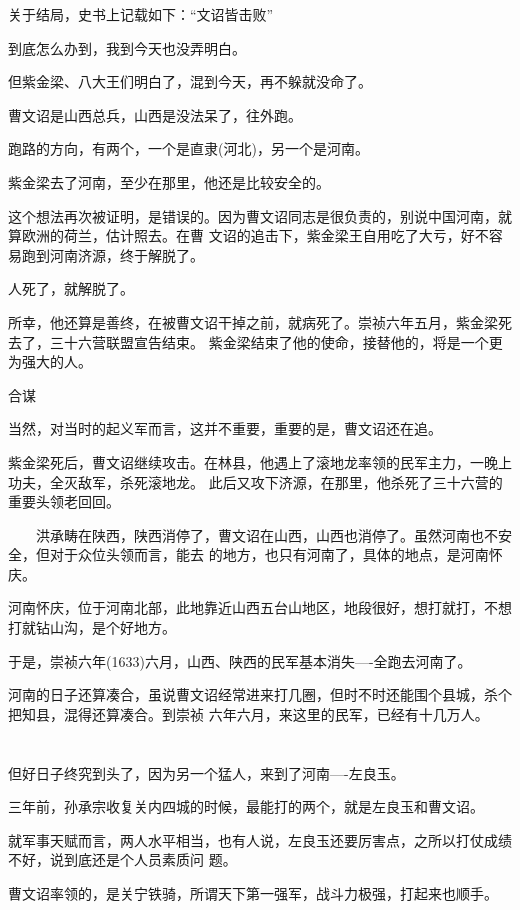 \documentclass[11pt,a4paper,onecolumn]{article}
\begin{document}
关于结局，史书上记载如下：``文诏皆击败''

到底怎么办到，我到今天也没弄明白。

但紫金梁、八大王们明白了，混到今天，再不躲就没命了。

曹文诏是山西总兵，山西是没法呆了，往外跑。

跑路的方向，有两个，一个是直隶(河北)，另一个是河南。

紫金梁去了河南，至少在那里，他还是比较安全的。

这个想法再次被证明，是错误的。因为曹文诏同志是很负责的，别说中国河南，就算欧洲的荷兰，估计照去。在曹
文诏的追击下，紫金梁王自用吃了大亏，好不容易跑到河南济源，终于解脱了。

人死了，就解脱了。

所幸，他还算是善终，在被曹文诏干掉之前，就病死了。崇祯六年五月，紫金梁死去了，三十六营联盟宣告结束。
紫金梁结束了他的使命，接替他的，将是一个更为强大的人。

合谋

当然，对当时的起义军而言，这并不重要，重要的是，曹文诏还在追。

紫金梁死后，曹文诏继续攻击。在林县，他遇上了滚地龙率领的民军主力，一晚上功夫，全灭敌军，杀死滚地龙。
此后又攻下济源，在那里，他杀死了三十六营的重要头领老回回。

　　洪承畴在陕西，陕西消停了，曹文诏在山西，山西也消停了。虽然河南也不安全，但对于众位头领而言，能去
的地方，也只有河南了，具体的地点，是河南怀庆。

河南怀庆，位于河南北部，此地靠近山西五台山地区，地段很好，想打就打，不想打就钻山沟，是个好地方。

于是，崇祯六年(1633)六月，山西、陕西的民军基本消失----全跑去河南了。

河南的日子还算凑合，虽说曹文诏经常进来打几圈，但时不时还能围个县城，杀个把知县，混得还算凑合。到崇祯
六年六月，来这里的民军，已经有十几万人。

\section[\thesection]{}

但好日子终究到头了，因为另一个猛人，来到了河南----左良玉。

三年前，孙承宗收复关内四城的时候，最能打的两个，就是左良玉和曹文诏。

就军事天赋而言，两人水平相当，也有人说，左良玉还要厉害点，之所以打仗成绩不好，说到底还是个人员素质问
题。

曹文诏率领的，是关宁铁骑，所谓天下第一强军，战斗力极强，打起来也顺手。
\end{document}
